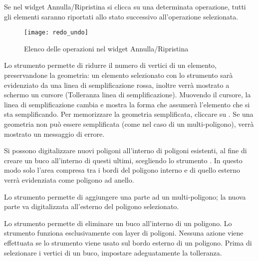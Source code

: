 Se nel widget Annulla/Ripristina si clicca su una determinata operazione, tutti gli
elementi saranno riportati allo stato successivo all'operazione selezionata.

\begin{figure}[ht]
   \centering
   \texttt{[image: redo\_undo]}
   \caption{Elenco delle operazioni nel widget Annulla/Ripristina \wincaption}
   \label{fig:vector_redoundo}
\end{figure}


Lo strumento  permette di ridurre il numero di 
vertici di un elemento, preservandone la geometria: un elemento selezionato con lo strumento 
sarà evidenziato da una linea di semplificazione rossa, inoltre verrà mostrato a schermo un cursore 
(Tolleranza linea di semplificazione). Muovendo il cursore, la linea di semplificazione cambia e 
mostra la forma che assumerà l'elemento che si sta semplificando. Per memorizzare la geometria 
semplificata, cliccare su .
Se una geometria non può essere semplificata (come nel caso di un multi-poligono), verrà mostrato un 
messaggio di errore.


Si possono digitalizzare nuovi poligoni all'interno di poligoni esistenti, al fine
di creare un buco all'interno di questi ultimi, scegliendo lo strumento .
In questo modo solo l'area compresa tra i bordi del poligono interno e di
quello esterno verrà  evidenziata come poligono ad anello. 


Lo strumento  permette di aggiungere 
una parte ad un multi-poligono; la nuova parte va digitalizzata all'esterno del poligono 
selezionato.


Lo strumento  permette di eliminare un 
buco all'interno di un poligono. Lo strumento funziona esclusivamente con layer di poligoni. 
Nessuna azione viene effettuata se lo strumento viene usato sul bordo esterno di un poligono.
Prima di selezionare i vertici di un buco, impostare adeguatamente la tolleranza.


